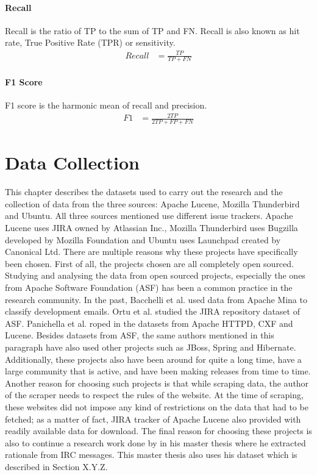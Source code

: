 \documentclass[a4paper,12pt,twoside]{report}
\begin{document}
\subsubsection{Recall} 
Recall is the ratio of TP to the sum of TP and FN. Recall is also known as hit rate, True Positive Rate (TPR) or sensitivity.
\begin{align*}
Recall &= \frac{TP}{TP +FN}
\end{align*}

\subsubsection{F1 Score} 
F1 score is the harmonic mean of recall and precision. 
\begin{align*}
F1 &= \frac{2TP}{2TP + FP + FN}
\end{align*}


\chapter{Data Collection}

This chapter describes the datasets used to carry out the research and the collection of data from the three sources: Apache Lucene, Mozilla Thunderbird and Ubuntu. All three sources mentioned use different issue trackers. Apache Lucene uses JIRA owned by Atlassian Inc., Mozilla Thunderbird uses Bugzilla developed by Mozilla Foundation and Ubuntu uses Launchpad created by Canonical Ltd. 
\bigbreak
There are multiple reasons why these projects have specifically been chosen. First of all, the projects chosen are all completely open sourced. Studying and analysing the data from open sourced projects, especially the ones from Apache Software Foundation (ASF) has been a common practice in the research community. In the past, Bacchelli et al.\cite{Bacchelli2012} used data from Apache Mina to classify development emails. Ortu et al.\cite{Ortu2015} studied the JIRA repository dataset of ASF. Panichella et al. \cite{Panichella2014} roped in the datasets from Apache HTTPD, CXF and Lucene. Besides datasets from ASF, the same authors mentioned in this paragraph have also used other projects such as JBoss, Spring and Hibernate. Additionally, these projects also have been around for quite a long time, have a large community that is active, and have been making releases from time to time. Another reason for choosing such projects is that while scraping data, the author of the scraper needs to respect the rules of the website. At the time of scraping, these websites did not impose any kind of restrictions on the data that had to be fetched; as a matter of fact, JIRA tracker of Apache Lucene also provided with readily available data for download. The final reason for choosing these projects is also to continue a research work done by \cite{Nonnenmacher2017} in his master thesis where he extracted rationale from IRC messages. This master thesis also uses his dataset which is described in Section X.Y.Z. 
\end{document}
